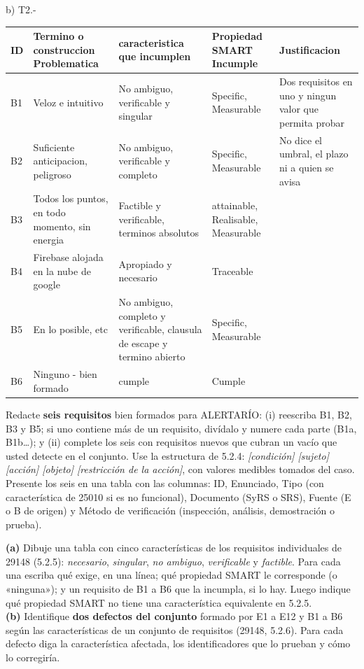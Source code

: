 \documentclass[11pt]{article}
\begin{document}
b) T2.-

{\small
\begin{longtable}{|L{0.9cm}|L{3.3cm}|L{3.6cm}|L{2.8cm}|L{4.2cm}|}
	\hline
	ID & Termino o construccion Problematica & caracteristica que incumplen & Propiedad SMART Incumple & Justificacion \\ \hline
	\endhead
	B1 & Veloz e intuitivo & No ambiguo, verificable y singular & Specific, Measurable & Dos requisitos en uno y ningun valor que permita probar \\ \hline
	B2 & Suficiente anticipacion, peligroso & No ambiguo, verificable y completo & Specific, Measurable & No dice el umbral, el plazo ni a quien se avisa \\ \hline
	B3 & Todos los puntos, en todo momento, sin energia & Factible y verificable, terminos absolutos & attainable, Realisable, Measurable & \\ \hline
	B4 & Firebase alojada en la nube de google & Apropiado y necesario & Traceable & \\ \hline
	B5 & En lo posible, etc & No ambiguo, completo y verificable, clausula de escape y termino abierto & Specific, Measurable & \\ \hline
	B6 & Ninguno - bien formado & cumple & Cumple & \\ \hline
\end{longtable}
}


\begin{cajatarea}[title={T3. Redacción de requisitos bien formados \hfill D3 · 30\,\%}]
	Redacte \textbf{seis requisitos} bien formados para ALERTARÍO: (i) reescriba B1, B2, B3 y B5; si uno contiene más de un requisito, divídalo y numere cada parte (B1a, B1b\ldots); y (ii) complete los seis con requisitos nuevos que cubran un vacío que usted detecte en el conjunto. Use la estructura de 5.2.4: \emph{[condición] [sujeto] [acción] [objeto] [restricción de la acción]}, con valores medibles tomados del caso.\\[4pt]
	Presente los seis en una tabla con las columnas: ID, Enunciado, Tipo (con característica de 25010 si es no funcional), Documento (SyRS o SRS), Fuente (E o B de origen) y Método de verificación (inspección, análisis, demostración o prueba).
\end{cajatarea}

\begin{cajatarea}[title={T4. Sustento normativo de la calidad \hfill D4 · 20\,\% (junto con las citas de T1 a T3)}]
	\textbf{(a)} Dibuje una tabla con cinco características de los requisitos individuales de 29148 (5.2.5): \emph{necesario}, \emph{singular}, \emph{no ambiguo}, \emph{verificable} y \emph{factible}. Para cada una escriba qué exige, en una línea; qué propiedad SMART le corresponde (o «ninguna»); y un requisito de B1 a B6 que la incumpla, si lo hay. Luego indique qué propiedad SMART no tiene una característica equivalente en 5.2.5.\\[4pt]
	\textbf{(b)} Identifique \textbf{dos defectos del conjunto} formado por E1 a E12 y B1 a B6 según las características de un conjunto de requisitos (29148, 5.2.6). Para cada defecto diga la característica afectada, los identificadores que lo prueban y cómo lo corregiría.
\end{cajatarea}
\end{document}
